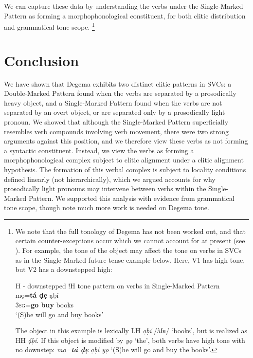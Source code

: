 \documentclass[output=paper]{langsci/langscibook}
\begin{document}
We can capture these data by understanding the verbs under the Single-Marked Pattern as forming a morphophonological constituent, for both clitic distribution and grammatical tone scope.%
\footnote{We 
  note that the full tonology of Degema has not been worked out, and that certain counter-exceptions occur which we cannot account for at present (see \citealt{Rolle2015}). For example, the tone of the object may affect the tone on verbs in SVCs as in the Single-Marked future tense example below. Here, V1 has high tone, but V2 has a downstepped high:

  \ea
  H - downstepped !H tone pattern on verbs in Single-Marked Pattern\\
  \gll mọ=\textbf{tá    ḍẹ}   ạḅí\\
  3\textsc{sg}=\textbf{go  buy}   books\\
  \glt ‘(S)he will go and buy books’ 
  \z 


  The object in this example is lexically LH \textit{ạḅí} /àɓɪ/ ‘books’, but is realized as HH \textit{ạ́ḅí}. If this object is modified by \textit{yọ} ‘the’, both verbs have high tone with no downstep: \textit{mọ=}\textbf{\textit{tá ḍẹ}} \textit{ạḅí yọ} ‘(S)he will go and buy the books’. 
}

\section{Conclusion}

We have shown that Degema exhibits two distinct clitic patterns in SVCs: a Double-Marked Pattern found when the verbs are separated by a prosodically heavy object, and a Single-Marked Pattern found when the verbs are not separated by an overt object, or are separated only by a prosodically light pronoun. We showed that although the Single-Marked Pattern superficially resembles verb compounds involving verb movement, there were two strong arguments against this position, and we therefore view these verbs as not forming a syntactic constituent. Instead, we view the verbs as forming a morphophonological complex subject to clitic alignment under a clitic alignment hypothesis. The formation of this verbal complex is subject to locality conditions defined linearly (not hierarchically), which we argued accounts for why prosodically light pronouns may intervene between verbs within the Single-Marked Pattern. We supported this analysis with evidence from grammatical tone scope, though note much more work is needed on Degema tone.
\end{document}
